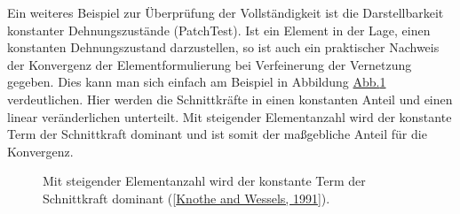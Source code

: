 \documentclass[letterpaper,10pt,german]{jupyterBook}
\let\sphinxpxdimen\pdfpxdimen\else\newdimen\sphinxpxdimen
\begin{document}
\sphinxAtStartPar
Ein weiteres Beispiel zur Überprüfung der Vollständigkeit ist die Darstellbarkeit konstanter Dehnungszustände (Patch\sphinxhyphen{}Test). Ist ein Element in der Lage, einen konstanten Dehnungszustand darzustellen, so ist auch ein praktischer Nachweis der Konvergenz der Elementformulierung bei Verfeinerung der Vernetzung gegeben. Dies kann man sich einfach am Beispiel in Abbildung \hyperref[\detokenize{chapters/chapter3/isoparametrischeFEM:konvergenzpatchtest}]{Abb.\@ \ref{\detokenize{chapters/chapter3/isoparametrischeFEM:konvergenzpatchtest}}} verdeutlichen. Hier werden die Schnittkräfte in einen konstanten Anteil und einen linear veränderlichen unterteilt. Mit steigender Elementanzahl wird der konstante Term der Schnittkraft dominant und ist somit der maßgebliche Anteil für die Konvergenz.

\begin{figure}[htbp]
\centering
\capstart

\noindent\sphinxincludegraphics[width=600\sphinxpxdimen]{{Knothe_02}.png}
\caption{Mit steigender Elementanzahl wird der konstante Term der Schnittkraft dominant ({[}\hyperlink{cite.quellen:id4}{Knothe and Wessels, 1991}{]}).}\label{\detokenize{chapters/chapter3/isoparametrischeFEM:konvergenzpatchtest}}\end{figure}
\end{document}
